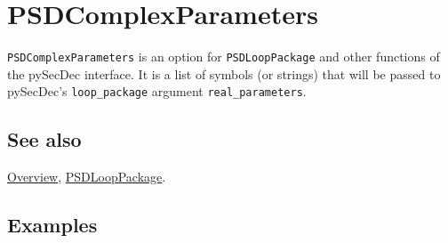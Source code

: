 \documentclass[../FeynHelpersManual.tex]{subfiles}
\begin{document}
\hypertarget{psdcomplexparameters}{
\section{PSDComplexParameters}\label{psdcomplexparameters}}

\texttt{PSDComplexParameters} is an option for \texttt{PSDLoopPackage}
and other functions of the pySecDec interface. It is a list of symbols
(or strings) that will be passed to pySecDec's \texttt{loop_package}
argument \texttt{real_parameters}.

\subsection{See also}

\hyperlink{toc}{Overview}, \hyperlink{psdlooppackage}{PSDLoopPackage}.

\subsection{Examples}
\end{document}
